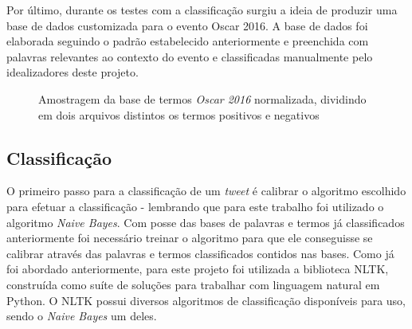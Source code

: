Por último, durante os testes com a classificação surgiu a ideia de produzir uma base de dados customizada para o evento Oscar 2016. A base de dados foi elaborada seguindo o padrão estabelecido anteriormente e preenchida com palavras relevantes ao contexto do evento e classificadas manualmente pelo idealizadores deste projeto.

\begin{figure}[H]
	
	\center
	\qquad
	\caption{Amostragem da base de termos \textit{Oscar 2016} normalizada, dividindo em dois arquivos distintos os termos positivos e negativos}
	
\end{figure}

\subsection{Classificação}
O primeiro passo para a classificação de um \textit{tweet} é calibrar o algoritmo escolhido para efetuar a classificação - lembrando que para este trabalho foi utilizado o algoritmo \textit{Naive Bayes}. Com posse das bases de palavras e termos já classificados anteriormente foi necessário treinar o algoritmo para que ele conseguisse se calibrar através das palavras e termos classificados contidos nas bases. 
Como já foi abordado anteriormente, para este projeto foi utilizada a biblioteca NLTK, construída como suíte de soluções para trabalhar com linguagem natural em Python. O NLTK possui diversos algoritmos de classificação disponíveis para uso, sendo o \textit{Naive Bayes} um deles.

